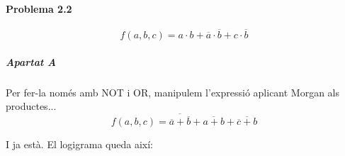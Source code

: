 



\page
\paragraph{Problema 2.2}

\begin{equation*}
  f(a,b,c) = a \cdot b + \overline{a} \cdot \overline{b} + c \cdot \overline{b}
\end{equation*}

\vspace{0.5em}


\subparagraph{Apartat A}

Per fer-la només amb \textsf{NOT} i \textsf{OR}, manipulem l'expressió aplicant Morgan als productes...
%
\begin{equation*}
  f(a,b,c) = \overline{\overline{a} + \overline{b}} + \overline{a + b} + \overline{\overline{c} + b}
\end{equation*}

I ja està. El logigrama queda així:

